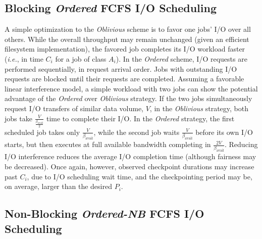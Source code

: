 \documentclass[conference,nofonttune]{IEEEtran}
\newcommand{\ie}[0]{\emph{i.e.}\xspace}
\newcommand{\bandavail}{\beta_{\text{avail}}}
\newcommand{\app}[1]{A_{#1}}
\newcommand{\period}[1]{P_{#1}}
\newcommand{\ckpt}[1]{C_{#1}}
\newcommand{\nocoop}{\emph{Oblivious}\xspace}
\newcommand{\fifoblock}{\emph{Ordered}\xspace}
\newcommand{\fifononblock}{\emph{Ordered-NB}\xspace}
\def\bfifofixed{\fifoblock-Fixed\xspace}
\def\bfifodaly{\fifoblock-Daly\xspace}
\begin{document}
\subsection{Blocking \fifoblock FCFS I/O Scheduling}
\label{sec:fcfsblock}

A simple optimization to the \nocoop scheme is to favor one jobs' I/O over all
others. While the overall throughput may remain unchanged (given an efficient
filesystem implementation), the favored job completes its I/O workload faster
(\ie, in time $\ckpt{i}$ for a job of class $\app{i}$).  In the \fifoblock
scheme, I/O requests are performed sequentially, in request arrival order. Jobs
with outstanding I/O requests are blocked until their requests are completed.
Assuming a favorable linear interference model, a simple workload with two jobs
can show the potential advantage of the \fifoblock over \nocoop strategy.  If
the two jobs simultaneously request I/O transfers of similar data volume, $V$,
in the \nocoop strategy, both jobs take $\frac{V}{\frac{\bandavail}{2}}$ time
to complete their I/O.  In the \fifoblock strategy, the first scheduled job
takes only $\frac{V}{\bandavail}$, while the second job waits
$\frac{V}{\bandavail}$ before its own I/O starts, but then executes at full
available bandwidth completing in $\frac{2V}{\bandavail}$.  Reducing I/O
interference reduces the average I/O completion time (although fairness may be
decreased).  Once again, however, observed checkpoint durations may increase
past $\ckpt{i}$, due to I/O scheduling wait time, and the checkpointing period
may be, on average, larger than the desired $\period{i}$.


\subsection{Non-Blocking \fifononblock FCFS I/O Scheduling}
\label{sec:fcfsnonblock}
\end{document}
